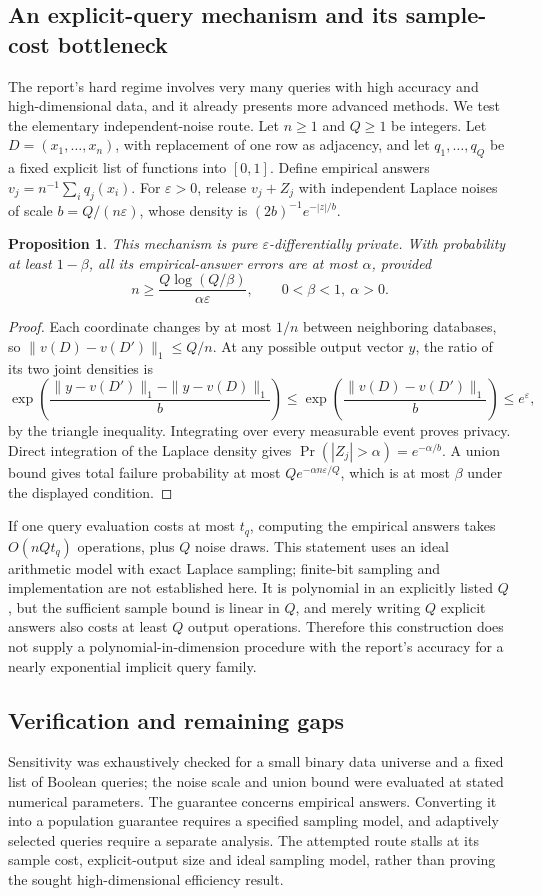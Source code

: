 \documentclass[11pt]{article}
\newtheorem{proposition}{Proposition}
\begin{document}
\subsection{An explicit-query mechanism and its sample-cost bottleneck}
The report's hard regime involves very many queries with high accuracy and high-dimensional data, and it already presents more advanced methods. We test the elementary independent-noise route. Let $n\ge1$ and $Q\ge1$ be integers. Let $D=(x_1,\ldots,x_n)$, with replacement of one row as adjacency, and let $q_1,\ldots,q_Q$ be a fixed explicit list of functions into $[0,1]$. Define empirical answers $v_j=n^{-1}\sum_iq_j(x_i)$. For $\varepsilon>0$, release $v_j+Z_j$ with independent Laplace noises of scale $b=Q/(n\varepsilon)$, whose density is $(2b)^{-1}e^{-|z|/b}$.
\begin{proposition}
This mechanism is pure $\varepsilon$-differentially private. With probability at least $1-\beta$, all its empirical-answer errors are at most $\alpha$, provided
\[
n\ge\frac{Q\log(Q/\beta)}{\alpha\varepsilon},\qquad 0<\beta<1,\ \alpha>0.
\]
\end{proposition}
\begin{proof}
Each coordinate changes by at most $1/n$ between neighboring databases, so $\|v(D)-v(D')\|_1\le Q/n$. At any possible output vector $y$, the ratio of its two joint densities is
\[
\exp\left(\frac{\|y-v(D')\|_1-\|y-v(D)\|_1}{b}\right)
\le\exp\left(\frac{\|v(D)-v(D')\|_1}{b}\right)\le e^\varepsilon,
\]
by the triangle inequality. Integrating over every measurable event proves privacy. Direct integration of the Laplace density gives $\Pr(|Z_j|>\alpha)=e^{-\alpha/b}$. A union bound gives total failure probability at most $Qe^{-\alpha n\varepsilon/Q}$, which is at most $\beta$ under the displayed condition.
\end{proof}
If one query evaluation costs at most $t_q$, computing the empirical answers takes $O(nQt_q)$ operations, plus $Q$ noise draws. This statement uses an ideal arithmetic model with exact Laplace sampling; finite-bit sampling and implementation are not established here. It is polynomial in an explicitly listed $Q$, but the sufficient sample bound is linear in $Q$, and merely writing $Q$ explicit answers also costs at least $Q$ output operations. Therefore this construction does not supply a polynomial-in-dimension procedure with the report's accuracy for a nearly exponential implicit query family.
\subsection{Verification and remaining gaps}
Sensitivity was exhaustively checked for a small binary data universe and a fixed list of Boolean queries; the noise scale and union bound were evaluated at stated numerical parameters. The guarantee concerns empirical answers. Converting it into a population guarantee requires a specified sampling model, and adaptively selected queries require a separate analysis. The attempted route stalls at its sample cost, explicit-output size and ideal sampling model, rather than proving the sought high-dimensional efficiency result.
\end{document}
